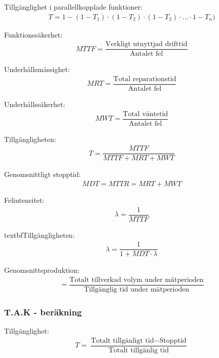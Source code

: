 			Tillgänglighet i parallellkopplade funktioner: 
      \begin{align*}
      T = 1 - (1-T_1) \cdot (1-T_2) \cdot (1-T_3) \cdot \ldots  \cdot 1-T_n) 
      \end{align*}
			
			Funktionssäkerhet: 
      \begin{align*}
      MTTF = \dfrac{\text{Verkligt utnyttjad drifttid}}{\text{Antalet fel}} 
      \end{align*}
			
			Underhållsmässighet: 
      \begin{align*}
      MRT = \dfrac{\text{Total reparationstid}}{\text{Antalet fel}} 
      \end{align*}
			
			Underhållssäkerhet: 
      \begin{align*}
      MWT = \dfrac{\text{Total väntetid}}{\text{Antalet fel}} 
      \end{align*}
			
			Tillgängligheten: 
      \begin{align*}
      T = \dfrac{MTTF}{MTTF+MRT+MWT}
      \end{align*}

			Genomsnittligt stopptid: 
      \begin{align*}
      MDT = MTTR = MRT + MWT
      \end{align*}

			Felintensitet: 
      \begin{align*}
      \lambda = \dfrac{1}{MTTF} 
      \end{align*}

			textbf{Tillgängligheten: }
      \begin{align*}
      \lambda = \dfrac{1}{1+MDT\cdot\lambda} 
      \end{align*}
			
      Genomsnittsproduktion: 
      \begin{align*}
			 = \dfrac{\text{Totalt tillverkad volym under mätperioden}}{\text{Tillgänglig tid under mätperioden}} 
      \end{align*}
			
			\subsubsection*{T.A.K - beräkning}
			
      Tillgänglighet: 
      \begin{align*}
			T = \dfrac{\text{Totalt tillgänligt tid} - \text{Stopptid}}{\text{Totalt tillgänlig tid}}
      \end{align*}
			
